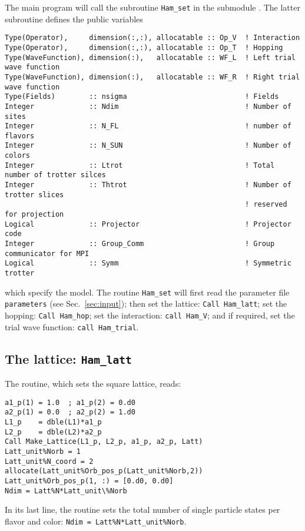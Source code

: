 The main program will call the subroutine \texttt{Ham\_set} in the submodule .
The latter  subroutine  defines the  public variables
\begin{lstlisting}[style=fortran]
Type(Operator),     dimension(:,:), allocatable :: Op_V  ! Interaction
Type(Operator),     dimension(:,:), allocatable :: Op_T  ! Hopping
Type(WaveFunction), dimension(:),   allocatable :: WF_L  ! Left trial wave function
Type(WaveFunction), dimension(:),   allocatable :: WF_R  ! Right trial wave function
Type(Fields)        :: nsigma                            ! Fields
Integer             :: Ndim                              ! Number of sites
Integer             :: N_FL                              ! number of flavors
Integer             :: N_SUN	                         ! Number of colors 
Integer             :: Ltrot                             ! Total number of trotter silces
Integer             :: Thtrot                            ! Number of trotter slices 
                                                         ! reserved for projection
Logical             :: Projector                         ! Projector code
Integer             :: Group_Comm                        ! Group communicator for MPI
Logical             :: Symm                              ! Symmetric trotter 
\end{lstlisting}
which specify the model.  The  routine \texttt{Ham\_set}  will first  read the parameter file \texttt{parameters} (see Sec.~\ref{sec:input}); then set the lattice: \texttt{Call Ham\_latt};  set the hopping: \texttt{Call Ham\_hop};  
 set the interaction: \texttt{call Ham\_V}; and if required, set the trial wave function: \texttt{call Ham\_trial}.

\subsection{The lattice: \texttt{Ham\_latt}} \label{U_PV_Ham_latt}

The routine, which sets the square lattice, reads:
\begin{lstlisting}[style=fortran]
a1_p(1) = 1.0  ; a1_p(2) = 0.d0
a2_p(1) = 0.0  ; a2_p(2) = 1.d0
L1_p    = dble(L1)*a1_p
L2_p    = dble(L2)*a2_p
Call Make_Lattice(L1_p, L2_p, a1_p, a2_p, Latt)
Latt_unit%Norb = 1
Latt_unit%N_coord = 2
allocate(Latt_unit%Orb_pos_p(Latt_unit%Norb,2))
Latt_unit%Orb_pos_p(1, :) = [0.d0, 0.d0]
Ndim = Latt%N*Latt_unit\%Norb

\end{lstlisting}
In its last line, the routine sets the total number of single particle states per flavor and color:
\texttt{Ndim = Latt\%N*Latt\_unit\%Norb}.

